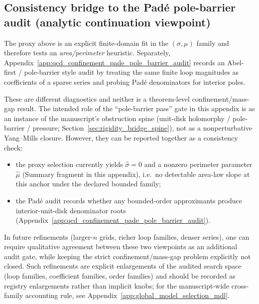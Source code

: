 \subsection{Consistency bridge to the Pad\'e pole-barrier audit (analytic continuation viewpoint)}
\label{subsec:qcd_proxy_pade_bridge}
\AuditTag The proxy above is an explicit finite-domain fit in the $(\sigma,\mu)$ family and therefore tests an \emph{area/perimeter} heuristic.
Separately, Appendix~\ref{app:qcd_confinement_pade_pole_barrier_audit} records an Abel-first / pole-barrier style audit by treating the same finite loop magnitudes as coefficients of a sparse series and probing Pad\'e denominators for interior poles.
\par
\AuditTag These are different diagnostics and neither is a theorem-level confinement/mass-gap result.
\AuditTag The intended role of the ``pole-barrier pass'' gate in this appendix is as an instance of the manuscript's obstruction spine
(unit-disk holomorphy / pole-barrier / pressure; Section~\ref{sec:rigidity_bridge_spine}), not as a nonperturbative Yang--Mills closure.
However, they can be reported together as a consistency check:
\begin{itemize}
\item the proxy selection currently yields $\widehat\sigma=0$ and a nonzero perimeter parameter $\widehat\mu$ (Summary fragment in this appendix), i.e.\ no detectable area-law slope at this anchor under the declared bounded family;
\item the Pad\'e audit records whether any bounded-order approximants produce interior-unit-disk denominator roots (Appendix~\ref{app:qcd_confinement_pade_pole_barrier_audit}).
\end{itemize}
In future refinements (larger-$n$ grids, richer loop families, denser series), one can require qualitative agreement between these two viewpoints as an additional audit gate, while keeping the strict confinement/mass-gap problem explicitly not closed.
\AuditTag Such refinements are explicit enlargements of the audited search space (loop families, coefficient families, order families) and should be recorded as registry enlargements rather than implicit knobs; for the manuscript-wide cross-family accounting rule, see Appendix~\ref{app:global_model_selection_mdl}.

